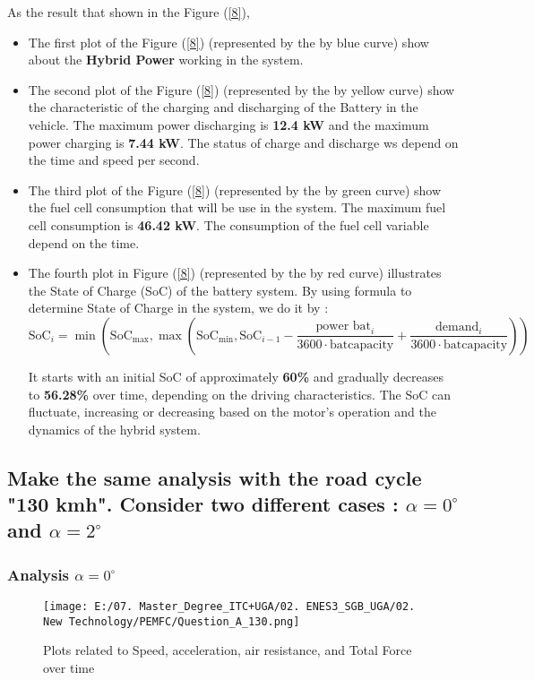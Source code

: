 \documentclass[12pt,a4paper]{article}
\numberwithin{equation}{section}
\begin{document}
{	As the result that shown in the Figure (\ref{8}), 
	\begin{itemize}
		\item The first plot of the Figure (\ref{8}) (represented by the by blue curve) show about the \textbf{Hybrid Power} working in the system.
		\item The second plot of the Figure (\ref{8}) (represented by the by yellow curve) show the characteristic of the charging and discharging of the Battery in the vehicle. The maximum power discharging is \textbf{12.4 kW} and the maximum power charging is \textbf{7.44 kW}. The status of charge and discharge ws depend on the time and speed per second.
		\item  The third plot of the Figure (\ref{8}) (represented by the by green curve) show the fuel cell consumption that will be use in the system. The maximum fuel cell consumption is \textbf{46.42 kW}. The consumption of the fuel cell variable depend on the time.
		\item The fourth plot in Figure (\ref{8}) (represented by the by red curve) illustrates the State of Charge (SoC) of the battery system. By using formula to determine State of Charge in the system, we do it by : 
	\begin{equation}
			\text{SoC}_i = \min\left( \text{SoC}_{\text{max}}, \max\left( \text{SoC}_{\text{min}}, \text{SoC}_{i-1} - \frac{\text{power bat}_i}{3600 \cdot \text{batcapacity}} + \frac{\text{demand}_i}{3600 \cdot \text{batcapacity}} \right) \right)
	\end{equation}

		
		It starts with an initial SoC of approximately \textbf{60\%} and gradually decreases to \textbf{56.28\%} over time, depending on the driving characteristics. The SoC can fluctuate, increasing or decreasing based on the motor's operation and the dynamics of the hybrid system.
		
	\end{itemize}



\subsection{Make the same analysis with the road cycle "130 kmh". Consider two different cases : $\alpha = 0^\circ$ and $\alpha = 2^\circ$ } 
	
	\subsubsection{Analysis $\alpha = 0^\circ$}
		\begin{figure}[h]
			\centering 
			\texttt{[image: E:/07. Master\_Degree\_ITC+UGA/02. ENES3\_SGB\_UGA/02. New Technology/PEMFC/Question\_A\_130.png]}
			\caption{\small {Plots related to Speed, acceleration, air resistance, and Total Force over time}}
			\label{9}
		\end{figure}

}
\end{document}

